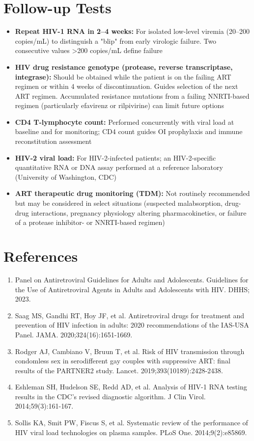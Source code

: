 \section*{Follow-up Tests}
\begin{itemize}
  \item \textbf{Repeat HIV-1 RNA in 2--4 weeks:} For isolated low-level viremia (20--200 copies/mL) to distinguish a "blip" from early virologic failure. Two consecutive values >200 copies/mL define failure
  \item \textbf{HIV drug resistance genotype (protease, reverse transcriptase, integrase):} Should be obtained while the patient is on the failing ART regimen or within 4 weeks of discontinuation. Guides selection of the next ART regimen. Accumulated resistance mutations from a failing NNRTI-based regimen (particularly efavirenz or rilpivirine) can limit future options
  \item \textbf{CD4 T-lymphocyte count:} Performed concurrently with viral load at baseline and for monitoring; CD4 count guides OI prophylaxis and immune reconstitution assessment
  \item \textbf{HIV-2 viral load:} For HIV-2-infected patients; an HIV-2-specific quantitative RNA or DNA assay performed at a reference laboratory (University of Washington, CDC)
  \item \textbf{ART therapeutic drug monitoring (TDM):} Not routinely recommended but may be considered in select situations (suspected malabsorption, drug-drug interactions, pregnancy physiology altering pharmacokinetics, or failure of a protease inhibitor- or NNRTI-based regimen)
\end{itemize}

\section*{References}
\begin{enumerate}
  \item Panel on Antiretroviral Guidelines for Adults and Adolescents. Guidelines for the Use of Antiretroviral Agents in Adults and Adolescents with HIV. DHHS; 2023.
  \item Saag MS, Gandhi RT, Hoy JF, et al. Antiretroviral drugs for treatment and prevention of HIV infection in adults: 2020 recommendations of the IAS-USA Panel. JAMA. 2020;324(16):1651-1669.
  \item Rodger AJ, Cambiano V, Bruun T, et al. Risk of HIV transmission through condomless sex in serodifferent gay couples with suppressive ART: final results of the PARTNER2 study. Lancet. 2019;393(10189):2428-2438.
  \item Eshleman SH, Hudelson SE, Redd AD, et al. Analysis of HIV-1 RNA testing results in the CDC's revised diagnostic algorithm. J Clin Virol. 2014;59(3):161-167.
  \item Sollis KA, Smit PW, Fiscus S, et al. Systematic review of the performance of HIV viral load technologies on plasma samples. PLoS One. 2014;9(2):e85869.
\end{enumerate}

\clearpage
